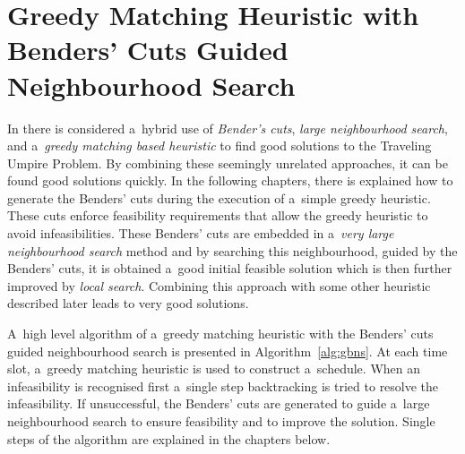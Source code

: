 \documentclass[a4paper, 10pt, twocolumn]{article}
\begin{document}
    \section{%
        Greedy Matching Heuristic with Benders' Cuts Guided Neighbourhood
        Search
    }
    \label{sec:method}

    In \cite{bendersCutsPaper, bendersCutsCollection} there is considered
    a~hybrid use of \emph{Bender's cuts}, \emph{large neighbourhood
    search}, and a~\emph{greedy matching based heuristic} to find good
    solutions to the Traveling Umpire Problem. By combining these seemingly
    unrelated approaches, it can be found good solutions quickly. In the
    following chapters, there is explained how to generate the Benders'
    cuts during the execution of a~simple greedy heuristic. These cuts
    enforce feasibility requirements that allow the greedy heuristic to
    avoid infeasibilities. These Benders' cuts are embedded in
    a~\emph{very large neighbourhood search} method and by searching this
    neighbourhood, guided by the Benders' cuts, it is obtained a~good
    initial feasible solution which is then further improved by \emph{local
    search}. Combining this approach with some other heuristic described
    later leads to very good solutions.

    A~high level algorithm of a~greedy matching heuristic with the
    Benders' cuts guided neighbourhood search is presented in
    Algorithm~\ref{alg:gbns}. At each time slot, a~greedy matching heuristic
    is used to construct a~schedule. When an infeasibility is recognised
    first a~single step backtracking is tried to resolve the infeasibility.
    If unsuccessful, the Benders' cuts are generated to guide a~large
    neighbourhood search to ensure feasibility and to improve the solution.
    Single steps of the algorithm are explained in the chapters below.
\end{document}
